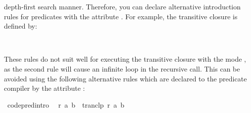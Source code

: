 \begin{isabellebody}
\begin{isamarkuptext}
  depth-first search manner.  Therefore, you can declare alternative
  introduction rules for predicates with the attribute \hyperlink{attribute.code-pred-intro}{\mbox{}}.  For example, the transitive closure is defined
  by:%
\end{isamarkuptext}%
\isamarkuptrue%
%
\isadelimquote
%
\endisadelimquote
%
\isatagquote
%
\begin{isamarkuptext}%
\\
\end{isamarkuptext}%
\isamarkuptrue%
%
\endisatagquote
{\isafoldquote}%
%
\isadelimquote
%
\endisadelimquote
%
\begin{isamarkuptext}%
\noindent These rules do not suit well for executing the transitive
  closure with the mode , as
  the second rule will cause an infinite loop in the recursive call.
  This can be avoided using the following alternative rules which are
  declared to the predicate compiler by the attribute \hyperlink{attribute.code-pred-intro}{\mbox{}}:%
\end{isamarkuptext}%
\isamarkuptrue%
%
\isadelimquote
%
\endisadelimquote
%
\isatagquote
{}\isamarkupfalse%
\ {}code{}pred{}intro{}{}\isanewline
\ \ {}r\ a\ b\ {}\ tranclp\ r\ a\ b{}\isanewline

\end{isabellebody}
